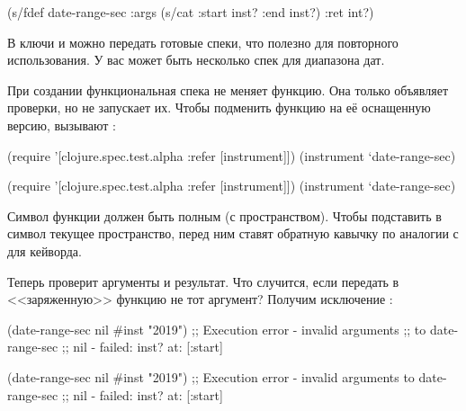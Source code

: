 

\begin{clojure}
(s/fdef date-range-sec
  :args (s/cat :start inst? :end inst?)
  :ret int?)
\end{clojure}


В ключи  и  можно передать готовые спеки, что полезно
для повторного использования. У вас может быть несколько спек для диапазона дат.

При создании функциональная спека не меняет функцию. Она только объявляет
проверки, но не запускает их. Чтобы подменить функцию на её оснащенную версию,
вызывают :

\ifnarrow


\begin{clojure}
(require '[clojure.spec.test.alpha
           :refer [instrument]])
(instrument `date-range-sec)
\end{clojure}


\else


\begin{clojure}
(require '[clojure.spec.test.alpha :refer [instrument]])
(instrument `date-range-sec)
\end{clojure}


\fi


Символ функции должен быть полным (с пространством). Чтобы подставить в символ
текущее пространство, перед ним ставят обратную кавычку  по аналогии с
\code{::} для кейворда.

Теперь  проверит аргументы и результат. Что случится,
если передать в <<заряженную>> функцию не тот аргумент? Получим исключение
:

\ifnarrow


\begin{clojure}
(date-range-sec nil #inst "2019")
;; Execution error - invalid arguments
;; to date-range-sec
;; nil - failed: inst? at: [:start]
\end{clojure}


\else


\begin{clojure}
(date-range-sec nil #inst "2019")
;; Execution error - invalid arguments to date-range-sec
;; nil - failed: inst? at: [:start]
\end{clojure}


\fi


